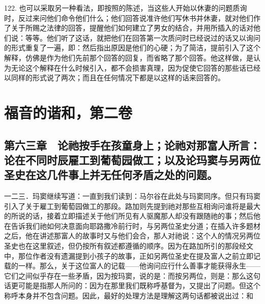 122. 也可以采取另一种看法，即按照的陈述，当这些人开始以休妻的问题质询时，反过来问他们命令他们什么；他们回答说准许他们写休书并休妻，就对他们作了关于所赐之法律的回答，提醒他们如何建立了男女的结合，并用所插入的话对他们说：等等。他们听了这话，就把他们在回答第一次质问时已经说过的话又以询问的形式重复了一遍，即：然后指出原因是他们的心硬；为了简洁，提前引入了这个解释，仿佛是作为他们先前那个回答的回复，而省略了那个回答。他这样做，是认为无论这个解释在什么时候引入，都不会损害真理，因为促使它回答的那些话已经以同样的形式说了两次；而且在任何情况下都是以这样的话来回答的。\par



\section{福音的谐和，第二卷}


\subsection{第六三章　论祂按手在孩童身上；论祂对那富人所言：论在不同时辰雇工到葡萄园做工；以及论玛窦与另两位圣史在这几件事上并无任何矛盾之处的问题。}

一二三．玛窦继续写道：一直到我们读到：马尔谷在此处与玛窦同序。但只有玛窦引入了关于雇工到葡萄园做工的那段。路加则先提到祂对那些互相询问谁将是最大的所说的话，接着立即描述关于他们所见有人驱魔那人却没有跟随祂的事；然后他在告诉我们祂如何决意面向耶路撒冷前行时，与另两位圣史分道；在插入许多题材之后，他在讲述那富人的故事时又与他们会合，那人对祂说：这个人的情况另两位圣史也在这里叙述，但仍按所有叙述都遵循的顺序。因为在路加所引的那段经文中，那位作者没有遗漏提到小孩子的故事，正如另两位圣史在提及富人之前立即记载的一样。那么，关于这位富人的记载——他询问应行什么善事才能获得永生——它们之间似乎存在一些矛盾，因为按玛窦，说的是：而按另两位，则是：那么这句话更可能是指那人所问的：因为在那里我们既称呼基督为，又提出了问题。但这个称呼本身并不包含问题。因此，最好的处理方法是理解这两句话都被说出过：和\par

